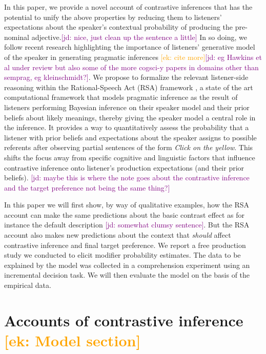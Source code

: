 \documentclass[10pt,letterpaper]{article}
\newcommand{\ek}[1]{\textcolor{Orange}{[ek: #1]}}
\newcommand{\jd}[1]{\textcolor{Purple}{[jd: #1]}}
\begin{document}
In this paper, we provide a novel account of contrastive inferences that has the potential to unify the above properties by reducing them to listeners' expectations about the speaker's contextual probability of producing the pre-nominal adjective.\jd{nice, just clean up the sentence a little} In so doing, we follow recent research highlighting the importance of listeners' generative model of the speaker in generating pragmatic inferences \cite{Degen:2019}\ek{cite more}\jd{eg Hawkins et al under review but also some of the more cogsci-y papers in domains other than semprag, eg kleinschmidt?}. We propose to formalize the relevant listener-side reasoning within the Rational-Speech Act (RSA) framework \cite{Frank:2012, Goodman:2016}, a state of the art computational framework that models pragmatic inference as the result of listeners performing Bayesian inference on their speaker model and their prior beliefs about likely meanings, thereby giving the speaker model a central role in the inference. It provides a way to quantitatively assess the probability that a listener with prior beliefs and expectations about the speaker assigns to possible referents after observing partial sentences of the form \emph{Click on the yellow}. This shifts the focus away from specific cognitive and linguistic factors that influence contrastive inference onto listener's production expectations (and their prior beliefs). \jd{maybe this is where the note goes about the contrastive inference and the target preference not being the same thing?}

In this paper we will first show, by way of qualitative examples, how the RSA account can make the same predictions about the basic contrast effect as for instance the default description \cite{Sedivy:2003} \jd{somewhat clumsy sentence}. But the RSA account also makes new predictions about the context that \emph{should} affect contrastive inference and final target preference. We report a free production study we conducted to elicit modifier probability estimates. The data to be explained by the model was collected in a comprehension experiment using an incremental decision task. We will then evaluate the model on the basis of the empirical data.


\section{Accounts of contrastive inference \ek{Model section}}
\end{document}
